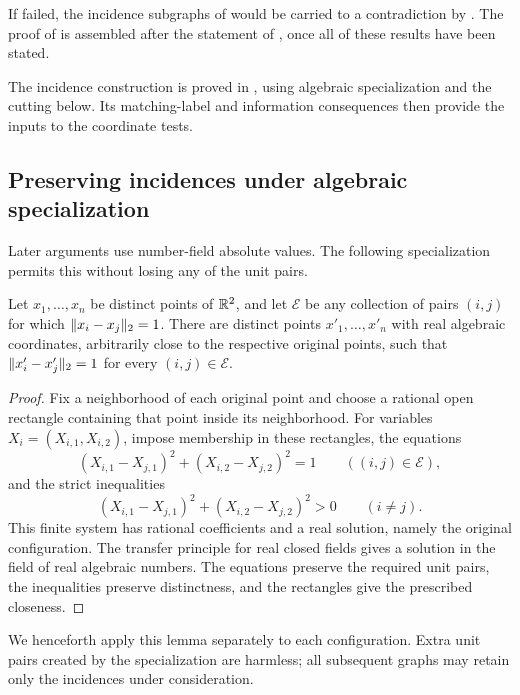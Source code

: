 If  failed, the incidence subgraphs of 
would be carried to a contradiction by
.
The proof of  is assembled after the statement of
, once all of these results have been stated.

The incidence construction is proved in , using
algebraic specialization and the cutting below. Its matching-label and
information consequences then provide the inputs to the coordinate tests.

\subsection{Preserving incidences under algebraic specialization}

Later arguments use number-field absolute values. The following
specialization permits this without losing any of the unit pairs.

\begin{lemma}\label{inc:specialization}
Let \(x_1,\ldots,x_n\) be distinct points of \(\mathbb R^2\), and let
\(\mathcal E\) be any collection of pairs \((i,j)\) for which
\(\lVert x_i-x_j\rVert_2=1\). There are distinct points
\(x'_1,\ldots,x'_n\) with real algebraic coordinates, arbitrarily close
to the respective original points, such that
\(\lVert x'_i-x'_j\rVert_2=1\) for every \((i,j)\in\mathcal E\).
\end{lemma}

\begin{proof}
Fix a neighborhood of each original point and choose a rational open
rectangle containing that point inside its neighborhood. For variables
\(X_i=(X_{i,1},X_{i,2})\), impose membership in these rectangles,
the equations
\[
 (X_{i,1}-X_{j,1})^2+(X_{i,2}-X_{j,2})^2=1
       \qquad ((i,j)\in\mathcal E),
\]
and the strict inequalities
\[
 (X_{i,1}-X_{j,1})^2+(X_{i,2}-X_{j,2})^2>0
       \qquad (i\ne j).
\]
This finite system has rational coefficients and a real solution, namely
the original configuration. The transfer principle for real closed fields
\cite[Theorems~3.1 and~4.1]{RCFTransfer} gives a solution in the field
of real algebraic numbers. The equations preserve the required unit pairs,
the inequalities preserve distinctness, and the rectangles give the
prescribed closeness.
\end{proof}

We henceforth apply this lemma separately to each configuration. Extra
unit pairs created by the specialization are harmless; all subsequent
graphs may retain only the incidences under consideration.

